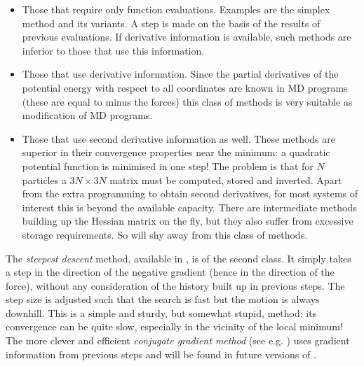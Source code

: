 \begin{itemize}
\item 	Those that require only function evaluations. Examples are the 
	simplex method and its variants. A step is made on the basis of the 
	results of previous evaluations. If derivative information is 
	available, such methods are inferior to those that use 
	this information.
\item 	Those that use derivative information. Since the partial 
	derivatives of the potential energy with respect to all 
	coordinates are known in MD programs (these are equal to minus 
	the forces) this class of methods is very suitable as modification 
	of MD programs.
\item 	Those that use second derivative information as well. These methods 
	are superior in their convergence properties near the minimum: a 
	quadratic potential function is minimised in one step! The problem 
	is that for $N$ particles a $3N\times 3N$ matrix must be computed, 
	stored and inverted. Apart from the extra programming to obtain 
	second derivatives, for most systems of interest this is beyond the 
	available capacity. There are intermediate methods building up the 
	Hessian matrix on the fly, but they also suffer from excessive 
	storage requirements. So {\gromacs} will shy away from this class 
	of methods.
\end{itemize}


The {\em steepest descent} method, available in {\gromacs}, is of the 
second class. It simply takes a step in the direction of the negative 
gradient (hence in the direction of the force), without any consideration 
of the history built up in previous steps. The step size is adjusted such 
that the search is fast but the motion is always downhill. This is a simple 
and sturdy, but somewhat stupid, method: its convergence can be quite slow, 
especially in the vicinity of the local minimum! The more clever and 
efficient {\em conjugate gradient method} (see e.g. \cite{Zimmerman91}) 
uses gradient information from previous steps and will be found in future 
versions of {\gromacs}.






